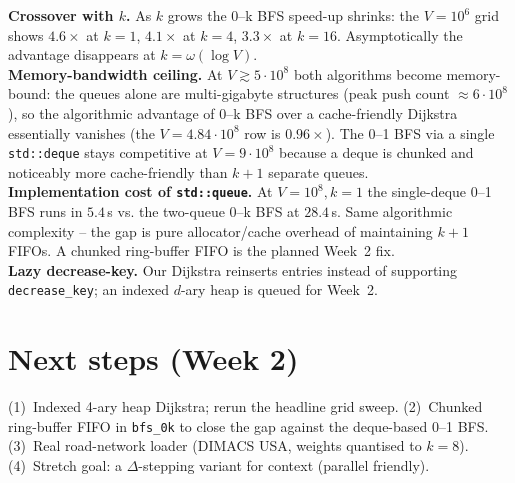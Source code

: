 \documentclass[11pt,a4paper]{article}
\begin{document}
\textbf{Crossover with $k$.} As $k$ grows the 0--k BFS speed-up shrinks:
the $V=10^6$ grid shows $4.6\times$ at $k=1$, $4.1\times$ at $k=4$,
$3.3\times$ at $k=16$. Asymptotically the advantage disappears at
$k = \omega(\log V)$.\\
\textbf{Memory-bandwidth ceiling.} At $V \gtrsim 5\cdot 10^8$ both
algorithms become memory-bound: the queues alone are multi-gigabyte
structures (peak push count $\approx 6\cdot 10^8$), so the algorithmic
advantage of 0--k BFS over a cache-friendly Dijkstra essentially vanishes
(the $V=4.84\cdot 10^8$ row is $0.96\times$). The 0--1 BFS via a single
\texttt{std::deque} stays competitive at $V=9\cdot 10^8$ because a deque
is chunked and noticeably more cache-friendly than $k{+}1$ separate queues.\\
\textbf{Implementation cost of \texttt{std::queue}.} At $V=10^8, k=1$ the
single-deque 0--1 BFS runs in $5.4$\,s vs. the two-queue 0--k BFS at
$28.4$\,s. Same algorithmic complexity -- the gap is pure allocator/cache
overhead of maintaining $k{+}1$ FIFOs. A chunked ring-buffer FIFO is the
planned Week~2 fix.\\
\textbf{Lazy decrease-key.} Our Dijkstra reinserts entries instead of
supporting \texttt{decrease\_key}; an indexed $d$-ary heap is queued for
Week~2.

\section{Next steps (Week 2)}

(1)~Indexed 4-ary heap Dijkstra; rerun the headline grid sweep.
(2)~Chunked ring-buffer FIFO in \texttt{bfs\_0k} to close the gap against
the deque-based 0--1 BFS.
(3)~Real road-network loader (DIMACS USA, weights quantised to $k=8$).
(4)~Stretch goal: a $\Delta$-stepping variant for context (parallel friendly).
\end{document}
